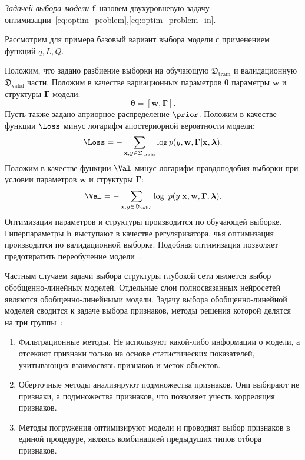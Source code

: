 \begin{defin}
\textit{Задачей выбора модели} $\mathbf{f}$ назовем   двухуровневую задачу оптимизации~\eqref{eq:optim_problem},\eqref{eq:optim_problem_in}.
\end{defin}

Рассмотрим для примера базовый вариант выбора модели с применением функций $q, L, Q$.
\begin{example}
Положим, что задано разбиение выборки на обучающую $\mathfrak{D}_\text{train}$ и валидационную $\mathfrak{D}_\text{valid}$ части.
Положим в качестве вариационных параметров $\boldsymbol{\theta}$ параметры $\mathbf{w}$ и структуры $\boldsymbol{\Gamma}$ модели:
\[
    \boldsymbol{\theta} = [\mathbf{w}, \boldsymbol{\Gamma}].
\]
Пусть также задано априорное распределение $\prior$.
Положим в качестве функции $\Loss$ минус логарифм апостериорной вероятности модели:
\[
    \Loss = -\sum_{\mathbf{x},y \in \mathfrak{D}_\text{train}} \log p(y, \mathbf{w}, \boldsymbol{\Gamma}|\mathbf{x}, \lam).
\]
Положим в качестве функции $\Val$  минус логарифм правдоподобия выборки при условии параметров $\mathbf{w}$ и структуры $\boldsymbol{\Gamma}$:
\[
    \Val = -\sum_{\mathbf{x},y \in \mathfrak{D}_\text{valid}} \log~p(y|\x, \mathbf{w}, \boldsymbol{\Gamma}, \lam).
\]
Оптимизация параметров и структуры производится по обучающей выборке. Гиперпараметры $\mathbf{h}$ выступают в качестве регуляризатора, чья оптимизация производится по валидационной выборке. Подобная оптимизация позволяет предотвратить переобучение модели~\cite{hyper}.
\end{example}

Частным случаем задачи выбора структуры глубокой сети является выбор обобщенно-линейных моделей. Отдельные слои полносвязанных нейросетей являются обобщенно-линейными модели. Задачу выбора обобщенно-линейной моделей сводится к задаче выбора признаков, методы решения которой делятся на три группы~\cite{feature_select}:
\begin{enumerate}
\item Фильтрационные методы. Не используют какой-либо информации о модели, а отсекают признаки только на основе статистических показателей, учитывающих взаимосвязь признаков и меток объектов.
\item Оберточные методы  анализируют подмножества признаков. Они выбирают не признаки, а подмножества признаков, что позволяет учесть корреляция признаков.
\item Методы погружения оптимизируют модели и проводият выбор признаков в единой процедуре, являясь комбинацией предыдущих типов отбора признаков.
\end{enumerate} 

